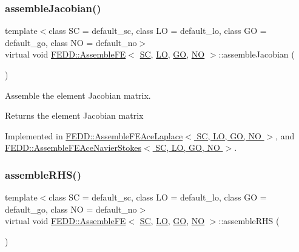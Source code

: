 \subsubsection{\texorpdfstring{assemble\+Jacobian()}{assembleJacobian()}}
{\footnotesize\ttfamily template$<$class SC  = default\+\_\+sc, class LO  = default\+\_\+lo, class GO  = default\+\_\+go, class NO  = default\+\_\+no$>$ \\
virtual void \hyperlink{classFEDD_1_1AssembleFE}{F\+E\+D\+D\+::\+Assemble\+FE}$<$ \hyperlink{fe__test__laplace_8cpp_a79c7e86a57edbb2a5a53242bcd04e41e}{SC}, \hyperlink{fe__test__laplace_8cpp_ad6a38c9f07d3fd633eefca5bccad8410}{LO}, \hyperlink{fe__test__laplace_8cpp_afa2946b509009b4f45eb04bd8c5b27d9}{GO}, \hyperlink{fe__test__laplace_8cpp_a5e24f37b28787429872b6ecb1d0417ce}{NO} $>$\+::assemble\+Jacobian (\begin{DoxyParamCaption}{ }\end{DoxyParamCaption})\hspace{0.3cm}{\ttfamily [pure virtual]}}



Assemble the element Jacobian matrix. 

\begin{DoxyReturn}{Returns}
the element Jacobian matrix 
\end{DoxyReturn}


Implemented in \hyperlink{classFEDD_1_1AssembleFEAceLaplace_ac47ac062ba522289f4e9a5dd2df78503}{F\+E\+D\+D\+::\+Assemble\+F\+E\+Ace\+Laplace$<$ S\+C, L\+O, G\+O, N\+O $>$}, and \hyperlink{classFEDD_1_1AssembleFEAceNavierStokes_a1535786ac6b897da287e3e7e0aa60f61}{F\+E\+D\+D\+::\+Assemble\+F\+E\+Ace\+Navier\+Stokes$<$ S\+C, L\+O, G\+O, N\+O $>$}.

\mbox{\label{classFEDD_1_1AssembleFE_a43f18446faadb45bb4e2eae4f82ba9ba}} 
\subsubsection{\texorpdfstring{assemble\+R\+H\+S()}{assembleRHS()}}
{\footnotesize\ttfamily template$<$class SC  = default\+\_\+sc, class LO  = default\+\_\+lo, class GO  = default\+\_\+go, class NO  = default\+\_\+no$>$ \\
virtual void \hyperlink{classFEDD_1_1AssembleFE}{F\+E\+D\+D\+::\+Assemble\+FE}$<$ \hyperlink{fe__test__laplace_8cpp_a79c7e86a57edbb2a5a53242bcd04e41e}{SC}, \hyperlink{fe__test__laplace_8cpp_ad6a38c9f07d3fd633eefca5bccad8410}{LO}, \hyperlink{fe__test__laplace_8cpp_afa2946b509009b4f45eb04bd8c5b27d9}{GO}, \hyperlink{fe__test__laplace_8cpp_a5e24f37b28787429872b6ecb1d0417ce}{NO} $>$\+::assemble\+R\+HS (\begin{DoxyParamCaption}{ }\end{DoxyParamCaption})\hspace{0.3cm}{\ttfamily [pure virtual]}}



